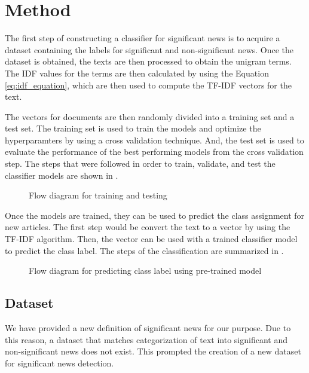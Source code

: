 \chapter{Method} \label{method}
The first step of constructing a classifier for significant news is to acquire a dataset containing the labels for significant and non-significant news. Once the dataset is obtained, the texts are then processed to obtain the unigram terms. The IDF values for the terms are then calculated by using the Equation \eqref{eq:idf_equation}, which are then used to compute the TF-IDF vectors for the text.

The vectors for documents are then randomly divided into a training set and a test set. The training set is used to train the models and optimize the hyperparamters by using a cross validation technique. And, the test set is used to evaluate the performance of the best performing models from the cross validation step. The steps that were followed in order to train, validate, and test the classifier models are shown in .

\begin{figure}[h]
    \caption{Flow diagram for training and testing}
    \label{fig:training}
\end{figure}

Once the models are trained, they can be used to predict the class assignment for new articles. The first step would be convert the  text to a vector by using the TF-IDF algorithm. Then, the vector can be used with a trained classifier model to predict the class label. The steps of the classification are summarized in .

\begin{figure}[h]
    \caption{Flow diagram for predicting class label using pre-trained model}
    \label{fig:prediction}
\end{figure}

\section{Dataset}
We have provided a new definition of significant news for our purpose. Due to this reason, a dataset that matches categorization of text into significant and non-significant news does not exist. This prompted the creation of a new dataset for significant news detection. 


